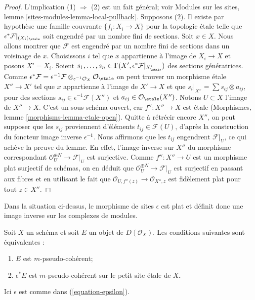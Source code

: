 \begin{proof}
L'implication (1) $\Rightarrow$ (2) est un fait g\'en\'eral; voir Modules sur
les sites, lemme \ref{sites-modules-lemma-local-pullback}.
Supposons (2). Il existe par hypoth\`ese une famille couvrante
$\{f_i : X_i \to X\}$ pour la topologie \'etale telle que
$\epsilon^*\mathcal{F}|_{(X_i)_\etale}$ soit engendr\'e par un nombre fini de
sections. Soit $x \in X$. Nous allons montrer que $\mathcal{F}$ est engendr\'e
par un nombre fini de sections dans un voisinage de $x$.
Choisissons $i$ tel que $x$ appartienne \`a l'image de $X_i \to X$ et posons
$X' = X_i$. Soient
$s_1, \ldots, s_n \in
\Gamma(X', \epsilon^*\mathcal{F}|_{X'_\etale})$
des sections g\'en\'eratrices. Comme
$\epsilon^*\mathcal{F} =
\epsilon^{-1}\mathcal{F} \otimes_{\epsilon^{-1}\mathcal{O}_X}
\mathcal{O}_\etale$
on peut trouver un morphisme \'etale $X'' \to X'$ tel que $x$ appartienne
\`a l'image de $X' \to X$ et que
$s_i|_{X''} = \sum s_{ij} \otimes a_{ij}$, pour des sections
$s_{ij} \in \epsilon^{-1}\mathcal{F}(X'')$ et
$a_{ij} \in \mathcal{O}_\etale(X'')$. Notons $U \subset X$ l'image de
$X'' \to X$. C'est un sous-sch\'ema ouvert, car $f'' : X'' \to X$ est \'etale
(Morphismes, lemme \ref{morphisms-lemma-etale-open}). Quitte \`a r\'etr\'ecir
encore $X''$, on peut supposer que les $s_{ij}$ proviennent d'\'el\'ements
$t_{ij} \in \mathcal{F}(U)$, d'apr\`es la construction du foncteur image
inverse $\epsilon^{-1}$. Nous affirmons que les $t_{ij}$ engendrent
$\mathcal{F}|_U$, ce qui ach\`eve la preuve du lemme. En effet, l'image inverse
sur $X''$ du morphisme correspondant
$\mathcal{O}_U^{\oplus N} \to \mathcal{F}|_U$ est surjective. Comme
$f'' : X'' \to U$ est un morphisme plat surjectif de sch\'emas, on en d\'eduit
que $\mathcal{O}_U^{\oplus N} \to \mathcal{F}|_U$ est surjectif en passant
aux fibres et en utilisant le fait que
$\mathcal{O}_{U, f''(z)} \to \mathcal{O}_{X'', z}$
est fid\`element plat pour tout $z \in X''$.
\end{proof}

\noindent
Dans la situation ci-dessus, le morphisme de sites $\epsilon$ est plat et
d\'efinit donc une image inverse sur les complexes de modules.

\begin{lemma}
\label{lemma-descend-pseudo-coherent}
Soit $X$ un sch\'ema et soit $E$ un objet de $D(\mathcal{O}_X)$.
Les conditions suivantes sont \'equivalentes :
\begin{enumerate}
\item $E$ est $m$-pseudo-coh\'erent;
\item $\epsilon^*E$ est $m$-pseudo-coh\'erent sur le petit site \'etale de $X$.
\end{enumerate}
Ici $\epsilon$ est comme dans (\ref{equation-epsilon}).
\end{lemma}

